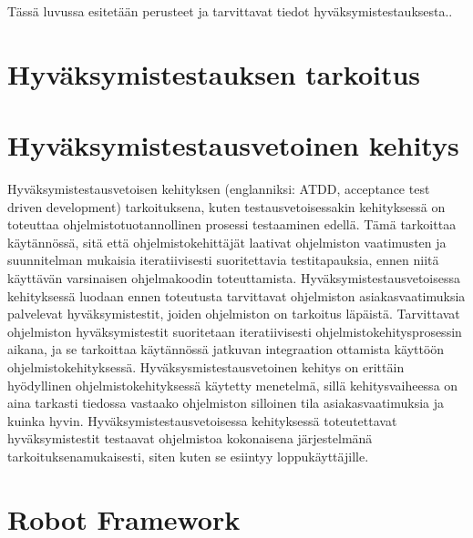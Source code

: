 Tässä luvussa esitetään perusteet ja tarvittavat tiedot hyväksymistestauksesta..

\section{Hyväksymistestauksen tarkoitus}




\section{Hyväksymistestausvetoinen kehitys}

Hyväksymistestausvetoisen kehityksen (englanniksi: ATDD, acceptance test driven development) tarkoituksena, kuten testausvetoisessakin kehityksessä on toteuttaa ohjelmistotuotannollinen prosessi testaaminen edellä.
Tämä tarkoittaa käytännössä, sitä että ohjelmistokehittäjät laativat ohjelmiston vaatimusten ja suunnitelman mukaisia iteratiivisesti suoritettavia testitapauksia, ennen niitä käyttävän varsinaisen ohjelmakoodin toteuttamista.
Hyväksymistestausvetoisessa kehityksessä luodaan ennen toteutusta tarvittavat ohjelmiston asiakasvaatimuksia palvelevat hyväksymistestit, joiden ohjelmiston on tarkoitus läpäistä.
Tarvittavat ohjelmiston hyväksymistestit suoritetaan iteratiivisesti ohjelmistokehitysprosessin aikana, ja se tarkoittaa käytännössä jatkuvan integraation ottamista käyttöön ohjelmistokehityksessä.
Hyväksysmistestausvetoinen kehitys on erittäin hyödyllinen ohjelmistokehityksessä käytetty menetelmä, sillä kehitysvaiheessa on aina tarkasti tiedossa vastaako ohjelmiston silloinen tila asiakasvaatimuksia ja kuinka hyvin.
Hyväksymistestausvetoisessa kehityksessä toteutettavat hyväksymistestit testaavat ohjelmistoa kokonaisena järjestelmänä tarkoituksenamukaisesti, siten kuten se esiintyy loppukäyttäjille.

\section{Robot Framework}

